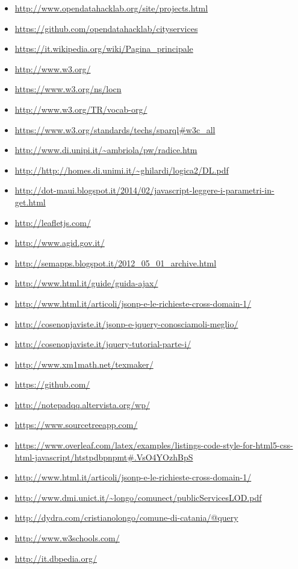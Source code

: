 \documentclass[a4paper,11pt]{article}
\begin{document}
\begin{itemize}
	\item \url{http://www.opendatahacklab.org/site/projects.html}
	\item \url{https://github.com/opendatahacklab/cityservices}
	\item \url{https://it.wikipedia.org/wiki/Pagina_principale}
	\item \url{http://www.w3.org/}
	\item \url{https://www.w3.org/ns/locn}
	\item \url{http://www.w3.org/TR/vocab-org/}
	\item \url{https://www.w3.org/standards/techs/sparql#w3c_all}
	\item \url{http://www.di.unipi.it/~ambriola/pw/radice.htm}
	\item \url{http://http://homes.di.unimi.it/~ghilardi/logica2/DL.pdf}
	\item \url{http://dot-maui.blogspot.it/2014/02/javascript-leggere-i-parametri-in-get.html}
	\item \url{http://leafletjs.com/}
	\item \url{http://www.agid.gov.it/}
	\item \url{http://semapps.blogspot.it/2012_05_01_archive.html}
	\item \url{http://www.html.it/guide/guida-ajax/}
	\item \url{http://www.html.it/articoli/jsonp-e-le-richieste-cross-domain-1/}
	
	\item \url{http://cosenonjaviste.it/jsonp-e-jquery-conosciamoli-meglio/}
	\item \url{http://cosenonjaviste.it/jquery-tutorial-parte-i/}
	\item \url{http://www.xm1math.net/texmaker/}
	\item \url{https://github.com/}
	\item \url{http://notepadqq.altervista.org/wp/}
	\item \url{https://www.sourcetreeapp.com/}
	\item \url{https://www.overleaf.com/latex/examples/listings-code-style-for-html5-css-html-javascript/htstpdbpnpmt#.VsO4YOzhBpS}
	\item \url{http://www.html.it/articoli/jsonp-e-le-richieste-cross-domain-1/}
	\item \url{http://www.dmi.unict.it/~longo/comunect/publicServicesLOD.pdf}
	\item {\url{http://dydra.com/cristianolongo/comune-di-catania/@query}}
	\item \url{http://www.w3schools.com/}
	\item \url{http://it.dbpedia.org/}

\end{itemize}

\newpage


\end{document}
